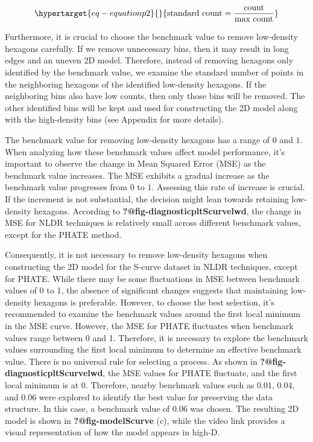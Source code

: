 \documentclass[
  12pt]{article}
\begin{document}
\begin{equation}\protect\hypertarget{eq-equationp2}{}{
\text{standard count} = \frac{\text{count}}{\text{max count}} 
}\label{eq-equationp2}\end{equation}

Furthermore, it is crucial to choose the benchmark value to remove
low-density hexagons carefully. If we remove unnecessary bins, then it
may result in long edges and an uneven 2D model. Therefore, instead of
removing hexagons only identified by the benchmark value, we examine the
standard number of points in the neighboring hexagons of the identified
low-density hexagons. If the neighboring bins also have low counts, then
only those bins will be removed. The other identified bins will be kept
and used for constructing the 2D model along with the high-density bins
(see Appendix for more details).

The benchmark value for removing low-density hexagons has a range of
\(0\) and \(1\). When analyzing how these benchmark values affect model
performance, it's important to observe the change in Mean Squared Error
(MSE) as the benchmark value increases. The MSE exhibits a gradual
increase as the benchmark value progresses from \(0\) to \(1\).
Assessing this rate of increase is crucial. If the increment is not
substantial, the decision might lean towards retaining low-density
hexagons. According to \textbf{?@fig-diagnosticpltScurvelwd}, the change
in MSE for NLDR techniques is relatively small across different
benchmark values, except for the PHATE method.

Consequently, it is not necessary to remove low-density hexagons when
constructing the 2D model for the S-curve dataset in NLDR techniques,
except for PHATE. While there may be some fluctuations in MSE between
benchmark values of 0 to 1, the absence of significant changes suggests
that maintaining low-density hexagons is preferable. However, to choose
the best selection, it's recommended to examine the benchmark values
around the first local minimum in the MSE curve. However, the MSE for
PHATE fluctuates when benchmark values range between 0 and 1. Therefore,
it is necessary to explore the benchmark values surrounding the first
local minimum to determine an effective benchmark value. There is no
universal rule for selecting a process. As shown in
\textbf{?@fig-diagnosticpltScurvelwd}, the MSE values for PHATE
fluctuate, and the first local minimum is at \(0\). Therefore, nearby
benchmark values such as \(0.01\), \(0.04\), and \(0.06\) were explored
to identify the best value for preserving the data structure. In this
case, a benchmark value of \(0.06\) was chosen. The resulting 2D model
is shown in \textbf{?@fig-modelScurve} (c), while the video link
provides a visual representation of how the model appears in high-D.
\end{document}

